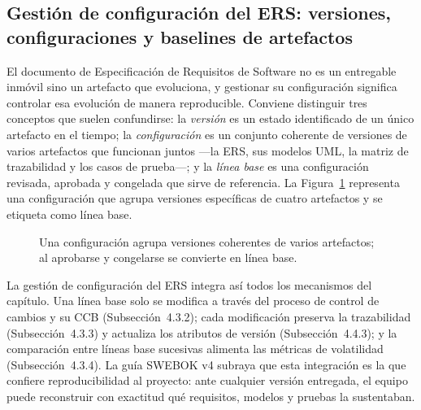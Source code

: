 \documentclass[11pt,a4paper,oneside]{report}
\begin{document}
	\subsection{Gesti\'on de configuraci\'on del ERS: versiones, configuraciones y baselines de artefactos}
	
	El documento de Especificaci\'on de Requisitos de Software no es un entregable inm\'ovil sino un artefacto que evoluciona, y gestionar su configuraci\'on significa controlar esa evoluci\'on de manera reproducible. Conviene distinguir tres conceptos que suelen confundirse: la \textit{versi\'on} es un estado identificado de un \'unico artefacto en el tiempo; la \textit{configuraci\'on} es un conjunto coherente de versiones de varios artefactos que funcionan juntos ---la ERS, sus modelos UML, la matriz de trazabilidad y los casos de prueba---; y la \textit{l\'inea base} es una configuraci\'on revisada, aprobada y congelada que sirve de referencia. La Figura~\ref{fig:config} representa una configuraci\'on que agrupa versiones espec\'ificas de cuatro artefactos y se etiqueta como l\'inea base.
	
	\begin{figure}[htbp]
		\centering
		\caption{Una configuraci\'on agrupa versiones coherentes de varios artefactos; al aprobarse y congelarse se convierte en l\'inea base.}
		\label{fig:config}
	\end{figure}
	
	La gesti\'on de configuraci\'on del ERS integra as\'i todos los mecanismos del cap\'itulo. Una l\'inea base solo se modifica a trav\'es del proceso de control de cambios y su CCB (Subsecci\'on~4.3.2); cada modificaci\'on preserva la trazabilidad (Subsecci\'on~4.3.3) y actualiza los atributos de versi\'on (Subsecci\'on~4.4.3); y la comparaci\'on entre l\'ineas base sucesivas alimenta las m\'etricas de volatilidad (Subsecci\'on~4.3.4). La gu\'ia SWEBOK v4 \citep{swebok_v4_2024} subraya que esta integraci\'on es la que confiere reproducibilidad al proyecto: ante cualquier versi\'on entregada, el equipo puede reconstruir con exactitud qu\'e requisitos, modelos y pruebas la sustentaban.
	
\end{document}
